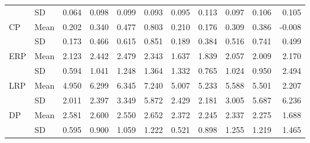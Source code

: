 \begin{longtable}{llrrrrrrrrr}
   & SD &      0.064 &      0.098 &      0.099 &      0.093 &      0.095 &      0.113 &      0.097 &      0.106 &      0.105 \\
\cline{1-11}
\multirow{2}{*}{CP} & Mean &      0.202 &      0.340 &      0.477 &      0.803 &      0.210 &      0.176 &      0.309 &      0.386 &     -0.008 \\
   & SD &      0.173 &      0.466 &      0.615 &      0.851 &      0.189 &      0.384 &      0.516 &      0.741 &      0.499 \\
\cline{1-11}
\multirow{2}{*}{ERP} & Mean &      2.123 &      2.442 &      2.479 &      2.343 &      1.637 &      1.839 &      2.057 &      2.009 &      2.170 \\
   & SD &      0.594 &      1.041 &      1.248 &      1.364 &      1.332 &      0.765 &      1.024 &      0.950 &      2.494 \\
\cline{1-11}
\multirow{2}{*}{LRP} & Mean &      4.950 &      6.299 &      6.345 &      7.240 &      5.007 &      5.233 &      5.588 &      5.501 &      2.207 \\
   & SD &      2.011 &      2.397 &      3.349 &      5.872 &      2.429 &      2.181 &      3.005 &      5.687 &      6.236 \\
\cline{1-11}
\multirow{2}{*}{DP} & Mean &      2.581 &      2.600 &      2.550 &      2.652 &      2.372 &      2.245 &      2.337 &      2.275 &      1.688 \\
   & SD &      0.595 &      0.900 &      1.059 &      1.222 &      0.521 &      0.898 &      1.255 &      1.219 &      1.465 \\
\end{longtable}
